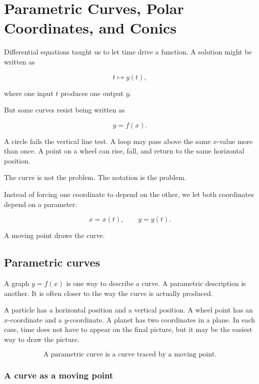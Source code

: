 
\chapter{Parametric Curves, Polar Coordinates, and Conics}
\label{chap:parametric-polar-conics}

Differential equations taught us to let time drive a function.  A solution might be
written as

\[
t\longmapsto y(t),
\]

where one input \(t\) produces one output \(y\).

But some curves resist being written as

\[
y=f(x).
\]

A circle fails the vertical line test.  A loop may pass above the same \(x\)-value more
than once.  A point on a wheel can rise, fall, and return to the same horizontal
position.

The curve is not the problem.  The notation is the problem.

Instead of forcing one coordinate to depend on the other, we let both coordinates
depend on a parameter:

\[
x=x(t),
\qquad
y=y(t).
\]

A moving point draws the curve.

\section{Parametric curves}
\label{sec:parametric-curves}

A graph \(y=f(x)\) is one way to describe a curve.  A parametric description is another.
It is often closer to the way the curve is actually produced.

A particle has a horizontal position and a vertical position.  A wheel point has an
\(x\)-coordinate and a \(y\)-coordinate.  A planet has two coordinates in a plane.  In
each case, time does not have to appear on the final picture, but it may be the easiest
way to draw the picture.

\[
\boxed{
\text{A parametric curve is a curve traced by a moving point.}
}
\]

\subsection{A curve as a moving point}
\label{subsec:curve-as-moving-point}


